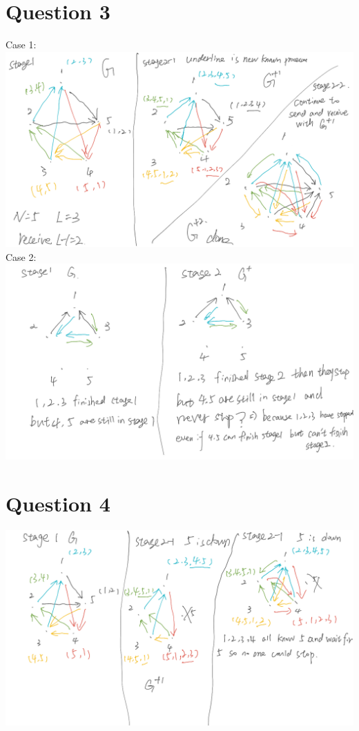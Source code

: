\documentclass{article}
\begin{document}
\section*{Question 3}
Case 1: \\
\includegraphics[width=\textwidth]{hw2_1}
Case 2: \\
\includegraphics[width=\textwidth]{hw2_2}

\section*{Question 4}
\includegraphics[width=\textwidth]{hw2_3}
\end{document}
